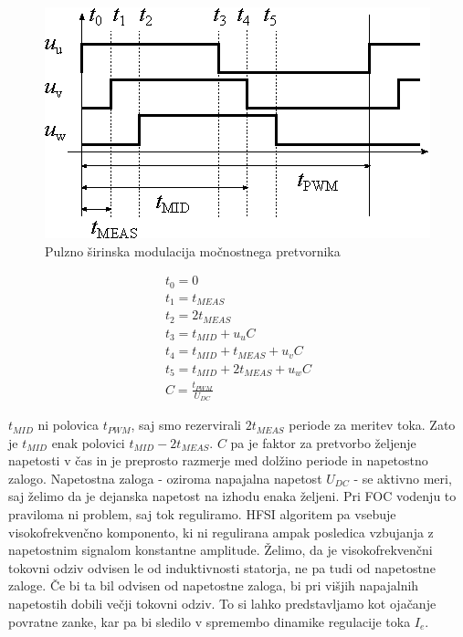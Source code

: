 \documentclass[a4paper,twoside,openright,12pt,slovene]{book}
\begin{document}
\begin{figure}[!htbp]
    \centering
    \includegraphics[width=1\columnwidth]{Slike/Inkscape/PWM.eps}
    \caption{\label{PWM} Pulzno širinska modulacija močnostnega pretvornika }
\end{figure}

\begin{equation} \label{izracunPWM}
\begin{gathered}
    t_0 = 0  \\
    t_1 = t_{MEAS}  \\
    t_2 = 2t_{MEAS}  \\
    t_3 = t_{MID} + u_uC  \\
    t_4 = t_{MID} + t_{MEAS} + u_vC \\
    t_5 = t_{MID} + 2t_{MEAS} + u_wC \\
    C = \frac{t_{PWM}}{U_{DC}}
\end{gathered}
\end{equation}

$t_{MID}$ ni polovica $t_{PWM}$, saj smo rezervirali $2t_{MEAS}$ periode za meritev toka. Zato je $t_{MID}$ enak polovici $t_{MID} - 2t_{MEAS}$. $C$ pa je faktor za pretvorbo željenje napetosti v čas
in je preprosto razmerje med dolžino periode in napetostno zalogo. Napetostna zaloga - oziroma napajalna napetost $U_{DC}$ - se aktivno meri, saj želimo da je dejanska napetost na izhodu enaka
željeni. Pri FOC vodenju to praviloma ni problem, saj tok reguliramo. HFSI algoritem pa vsebuje visokofrekvenčno komponento, ki ni regulirana ampak posledica vzbujanja z napetostnim signalom
konstantne amplitude. Želimo, da je visokofrekvenčni tokovni odziv odvisen le od induktivnosti statorja, ne pa tudi od napetostne zaloge. Če bi ta bil odvisen od napetostne zaloga, bi pri višjih
napajalnih napetostih dobili večji tokovni odziv. To si lahko predstavljamo kot ojačanje povratne zanke, kar pa bi sledilo v spremembo dinamike regulacije toka $I_e$.
\end{document}

